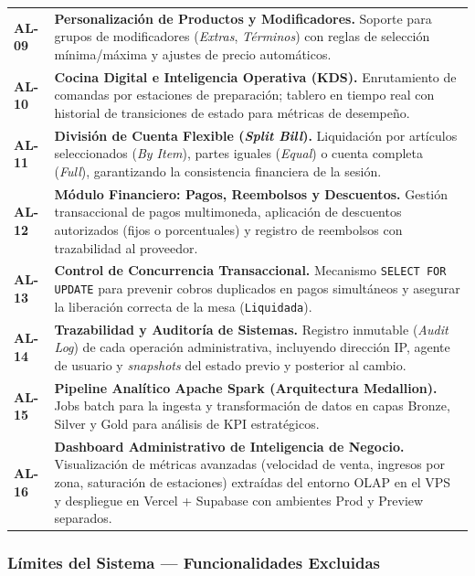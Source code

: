 {\begin{longtable}{>{\centering\bfseries\arraybackslash}p{1.2cm}
                >{\raggedright\arraybackslash}p{14.2cm}}
AL-09 & \textbf{Personalizaci\'on de Productos y Modificadores.} Soporte para grupos de modificadores (\textit{Extras}, \textit{T\'erminos}) con reglas de selecci\'on m\'inima/m\'axima y ajustes de precio autom\'aticos. \\
\rowcolor{altrow}
AL-10 & \textbf{Cocina Digital e Inteligencia Operativa (KDS).} Enrutamiento de comandas por estaciones de preparaci\'on; tablero en tiempo real con historial de transiciones de estado para m\'etricas de desempe\~no. \\
AL-11 & \textbf{Divisi\'on de Cuenta Flexible (\textit{Split Bill}).} Liquidaci\'on por art\'iculos seleccionados (\textit{By Item}), partes iguales (\textit{Equal}) o cuenta completa (\textit{Full}), garantizando la consistencia financiera de la sesi\'on. \\
\rowcolor{altrow}
AL-12 & \textbf{M\'odulo Financiero: Pagos, Reembolsos y Descuentos.} Gesti\'on transaccional de pagos multimoneda, aplicaci\'on de descuentos autorizados (fijos o porcentuales) y registro de reembolsos con trazabilidad al proveedor. \\
AL-13 & \textbf{Control de Concurrencia Transaccional.} Mecanismo \texttt{SELECT FOR UPDATE} para prevenir cobros duplicados en pagos simult\'aneos y asegurar la liberaci\'on correcta de la mesa (\texttt{Liquidada}). \\
\rowcolor{altrow}
AL-14 & \textbf{Trazabilidad y Auditor\'ia de Sistemas.} Registro inmutable (\textit{Audit Log}) de cada operaci\'on administrativa, incluyendo direcci\'on IP, agente de usuario y \textit{snapshots} del estado previo y posterior al cambio. \\
AL-15 & \textbf{Pipeline Anal\'itico Apache Spark (Arquitectura Medallion).} Jobs batch para la ingesta y transformaci\'on de datos en capas Bronze, Silver y Gold para an\'alisis de KPI estrat\'egicos. \\
\rowcolor{altrow}
AL-16 & \textbf{Dashboard Administrativo de Inteligencia de Negocio.} Visualizaci\'on de m\'etricas avanzadas (velocidad de venta, ingresos por zona, saturaci\'on de estaciones) extra\'idas del entorno OLAP en el VPS y despliegue en Vercel + Supabase con ambientes Prod y Preview separados. \\
\end{longtable}
}

\newpage
\subsubsection{Límites del Sistema — Funcionalidades Excluidas}

